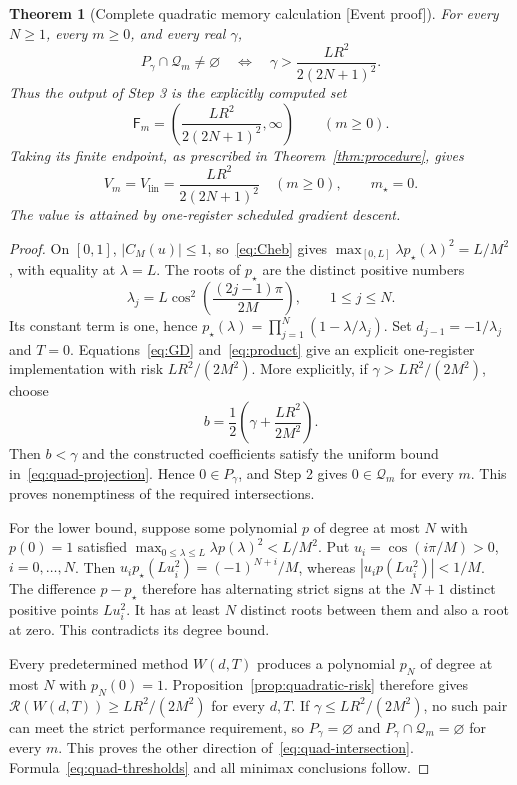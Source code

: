 \documentclass[11pt]{article}
\newcommand{\supportlabel}[1]{\textcolor{blue!60!black}{\small\textsf{[#1]}}}
\newcommand{\eventproof}{\supportlabel{Event proof}}
\numberwithin{equation}{section}
\newtheorem{theorem}{Theorem}[section]
\theoremstyle{definition}
\newcommand{\Q}{\mathcal Q}
\newcommand{\risk}{\mathcal R}
\begin{document}
\begin{theorem}[Complete quadratic memory calculation \eventproof]\label{thm:quadratic}
For every $N\ge1$, every $m\ge0$, and every real $\gamma$,
\begin{equation}
 P_\gamma\cap\Q_m\ne\varnothing
 \quad\Longleftrightarrow\quad
 \gamma>\frac{LR^2}{2(2N+1)^2}.
 \label{eq:quad-intersection}
\end{equation}
Thus the output of Step 3 is the explicitly computed set
\begin{equation}
 \mathsf F_m=\left(\frac{LR^2}{2(2N+1)^2},\infty\right)
 \qquad(m\ge0).
 \label{eq:quad-thresholds}
\end{equation}
Taking its finite endpoint, as prescribed in Theorem~\ref{thm:procedure}, gives
\begin{equation}
 V_m=V_{\mathrm{lin}}=\frac{LR^2}{2(2N+1)^2}
 \quad(m\ge0),\qquad m_\star=0.
 \label{eq:quad-values}
\end{equation}
The value is attained by one-register scheduled gradient descent.
\end{theorem}
\begin{proof}
On $[0,1]$, $|C_M(u)|\le1$, so~\eqref{eq:Cheb} gives
$\max_{[0,L]}\lambda p_\star(\lambda)^2=L/M^2$, with equality at $\lambda=L$.
The roots of $p_\star$ are the distinct positive numbers
\[
 \lambda_j=L\cos^2\left(\frac{(2j-1)\pi}{2M}\right),
 \qquad 1\le j\le N.
\]
Its constant term is one, hence
$p_\star(\lambda)=\prod_{j=1}^N(1-\lambda/\lambda_j)$.
Set $d_{j-1}=-1/\lambda_j$ and $T=0$. Equations~\eqref{eq:GD} and~\eqref{eq:product} give an explicit one-register implementation with risk $LR^2/(2M^2)$.
More explicitly, if $\gamma>LR^2/(2M^2)$, choose
\[
 b=\frac12\left(\gamma+\frac{LR^2}{2M^2}\right).
\]
Then $b<\gamma$ and the constructed coefficients satisfy the uniform bound in~\eqref{eq:quad-projection}. Hence $0\in P_\gamma$, and Step 2 gives $0\in\Q_m$ for every $m$. This proves nonemptiness of the required intersections.

For the lower bound, suppose some polynomial $p$ of degree at most $N$ with $p(0)=1$ satisfied $\max_{0\le\lambda\le L}\lambda p(\lambda)^2<L/M^2$. Put
$u_i=\cos(i\pi/M)>0$, $i=0,\ldots,N$.
Then $u_i p_\star(Lu_i^2)=(-1)^{N+i}/M$, whereas
$|u_i p(Lu_i^2)|<1/M$. The difference $p-p_\star$ therefore has alternating strict signs at the $N+1$ distinct positive points $Lu_i^2$. It has at least $N$ distinct roots between them and also a root at zero. This contradicts its degree bound.

Every predetermined method $W(d,T)$ produces a polynomial $p_N$ of degree at most $N$ with $p_N(0)=1$. Proposition~\ref{prop:quadratic-risk} therefore gives $\risk(W(d,T))\ge LR^2/(2M^2)$ for every $d,T$. If $\gamma\le LR^2/(2M^2)$, no such pair can meet the strict performance requirement, so $P_\gamma=\varnothing$ and $P_\gamma\cap\Q_m=\varnothing$ for every $m$. This proves the other direction of~\eqref{eq:quad-intersection}. Formula~\eqref{eq:quad-thresholds} and all minimax conclusions follow.
\end{proof}
\end{document}
